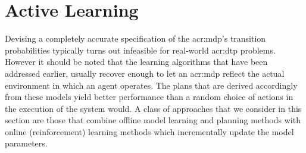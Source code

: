 
%
%


%
%

%
%

\section{Active Learning}
\label{sec:active-learning}

Devising a completely accurate specification of the \acrshort{acr:mdp}'s transition probabilities typically turns out infeasible for real-world \acrshort{acr:dtp} problems.
However it should be noted that the learning algorithms that have been addressed earlier, usually recover enough to let an \acrshort{acr:mdp} reflect the actual environment in which an agent operates.
The plans that are derived accordingly from these models yield better performance than a random choice of actions in the execution of the system would.
A class of approaches that we consider in this section are those that combine offline model learning and planning methods with online (reinforcement) learning methods which incrementally update the model parameters.

